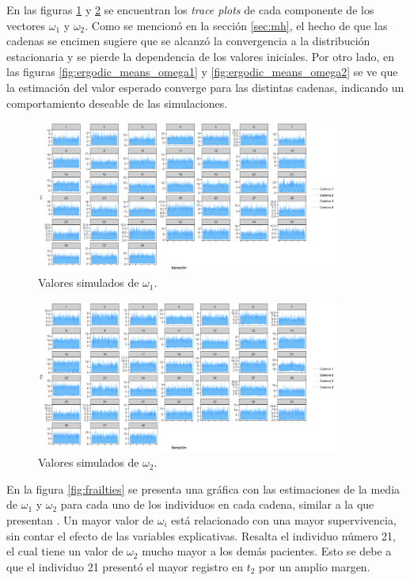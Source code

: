 \documentclass[11pt,a4paper]{article}
\begin{document}
En las figuras \ref{fig:traceplot_omega1} y \ref{fig:traceplot_omega2} se encuentran los \textit{trace plots} de cada componente de los vectores $\omega_1$ y $\omega_2$. Como se mencionó en la sección \ref{sec:mh}, el hecho de que las cadenas se encimen sugiere que se alcanzó la convergencia a la distribución estacionaria y se pierde la dependencia de los valores iniciales. Por otro lado, en las figuras \ref{fig:ergodic_means_omega1} y \ref{fig:ergodic_means_omega2} se ve que la estimación del valor esperado converge para las distintas cadenas, indicando un comportamiento deseable de las simulaciones.\\

\begin{figure}[!p]
\centering\includegraphics[width=10cm]{traceplots_omega1.png}
\caption{Valores simulados de $\omega_1$.}
\label{fig:traceplot_omega1}
\end{figure}

\begin{figure}[!p]
\centering\includegraphics[width=10cm]{traceplots_omega2.png}
\caption{Valores simulados de $\omega_2$.}
\label{fig:traceplot_omega2}
\end{figure}

En la figura \ref{fig:frailties} se presenta una gráfica con las estimaciones de la media de $\omega_1$ y $\omega_2$ para cada uno de los individuos en cada cadena, similar a la que presentan \citet{nieto}. Un mayor valor de $\omega_i$ está relacionado con una mayor supervivencia, sin contar el efecto de las variables explicativas. Resalta el individuo número 21, el cual tiene un valor de $\omega_2$ mucho mayor a los demás pacientes. Esto se debe a que el individuo 21 presentó el mayor registro en $t_2$ por un amplio margen.\\
\end{document}
